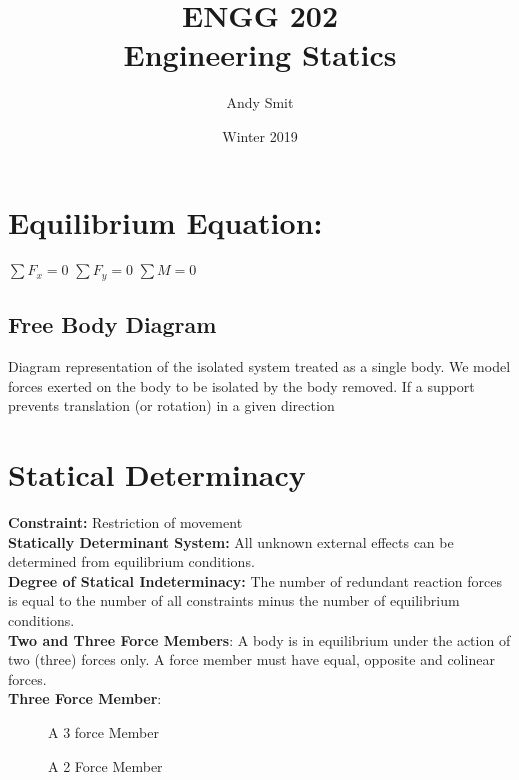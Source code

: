 \documentclass[14pt]{article}
\title{ENGG 202\\Engineering Statics}
\author{Andy Smit}
\date{Winter 2019}
\begin{document}
    \maketitle
    \section{Equilibrium Equation:}
    $\sum F_x=0$ $\sum F_y=0$ $\sum M=0$
    \subsection{Free Body Diagram}
    Diagram representation of the isolated system treated as a single body.
    We model forces exerted on the body to be isolated by the body removed. If a support prevents translation (or rotation) in a given direction     
    \section{Statical Determinacy}
    \textbf{Constraint: } Restriction of movement\\
    \textbf{Statically Determinant System: }All unknown external effects can be determined from equilibrium conditions.\\
    \textbf{Degree of Statical Indeterminacy: }The number of redundant reaction forces is equal to the number of all constraints minus the number of equilibrium conditions.\\
    \textbf{Two and Three Force Members}: A body is in equilibrium under the action of two (three) forces only. A force member must have equal, opposite and colinear forces.\\
    \textbf{Three Force Member}:\\
    
    \begin{figure}[h]
        \caption{A 3 force Member}
    \end{figure}
    \begin{figure}[h]
        \caption{A 2 Force Member}

    \end{figure}
\end{document}
